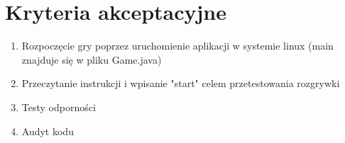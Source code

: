 \documentclass{article}
\begin{document}
\section{Kryteria akceptacyjne}
\begin{enumerate}
  \item Rozpoczęcie gry poprzez uruchomienie aplikacji w systemie linux (main znajduje się w pliku Game.java)
  \item Przeczytanie instrukcji i wpisanie "start" celem przetestowania rozgrywki
  \item Testy odporności
  \item Audyt kodu
\end{enumerate}
\end{document}

